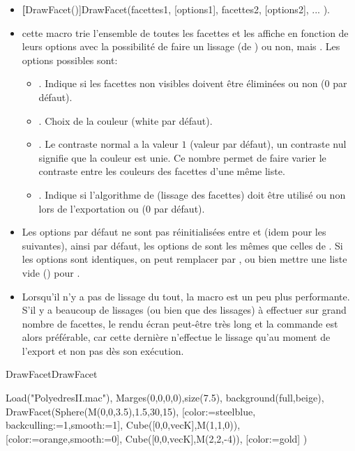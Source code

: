 \begin{itemize}
 \item \util \textbf[DrawFacet()]{DrawFacet(facettes1, [options1], facettes2, [options2], ... )}.
 \item \desc cette macro trie l'ensemble de toutes les facettes et les affiche en fonction de leurs options avec la possibilité de faire un lissage (de \Gouraud) ou non, mais . Les options possibles sont:

  \begin{itemize}
  \item {}. Indique si les facettes non visibles doivent être éliminées ou non (0 par défaut).
  \item {}. Choix de la couleur (white par défaut).
  \item {}. Le contraste normal a la valeur $1$ (valeur par défaut), un contraste nul signifie que la couleur est unie. Ce nombre permet de faire varier le contraste entre les couleurs des facettes d'une même liste.
  \item {}. Indique si l'algorithme de \Gouraud (lissage des facettes) doit être utilisé ou non lors de l'exportation  ou  (0 par défaut). 
  \end{itemize}
 \item Les options par défaut ne sont pas réinitialisées entre  et  (idem pour les suivantes), ainsi par défaut, les options de  sont les mêmes que celles de . Si les options sont identiques, on peut remplacer  par , ou bien mettre une liste vide (\co{[]}) pour .
 \item Lorsqu'il n'y a pas de lissage du tout, la macro  est un peu plus performante. S'il y a beaucoup de lissages (ou bien que des lissages) à effectuer sur grand nombre de facettes, le rendu écran peut-être très long et la commande  est alors préférable, car cette dernière n'effectue le lissage qu'au moment de l'export et non pas dès son exécution.
\end{itemize}

\pngtrue
\begin{demo}{DrawFacet}{DrawFacet}
\begin{texgraph}[name=DrawFacet,
         export=eps]
Load("PolyedresII.mac"),
Marges(0,0,0,0),size(7.5),
background(full,beige),
DrawFacet(Sphere(M(0,0,3.5),1.5,30,15),
        [color:=steelblue,
        backculling:=1,smooth:=1],
     Cube([0,0,vecK],M(1,1,0)),
        [color:=orange,smooth:=0],
     Cube([0,0,vecK],M(2,2,-4)),
        [color:=gold]
        )
\end{texgraph}
\end{demo}
\pngfalse


